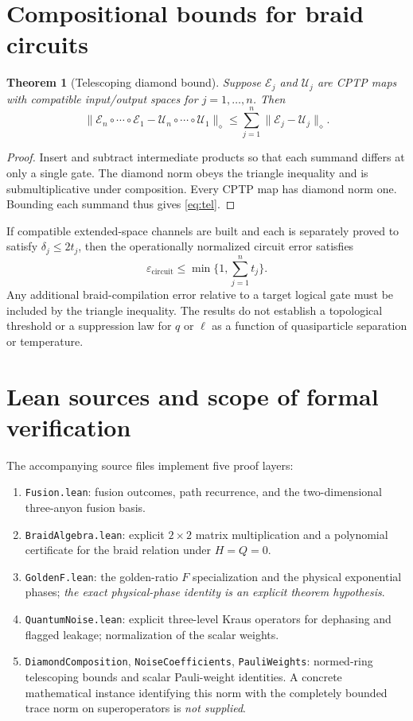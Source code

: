 \documentclass[11pt,a4paper]{article}
\newtheorem{theorem}{Theorem}[section]
\theoremstyle{remark}
\begin{document}
\section{Compositional bounds for braid circuits}
\begin{theorem}[Telescoping diamond bound]\label{thm:telescoping}
Suppose $\mathcal E_j$ and $\mathcal U_j$ are CPTP maps with compatible input/output spaces for $j=1,\dots,n$. Then
\begin{equation}\label{eq:tel}
\|\mathcal E_n\circ\cdots\circ\mathcal E_1
-\mathcal U_n\circ\cdots\circ\mathcal U_1\|_\diamond
\le \sum_{j=1}^n\|\mathcal E_j-\mathcal U_j\|_\diamond.
\end{equation}
\end{theorem}
\begin{proof}
Insert and subtract intermediate products so that each summand differs at only a single gate. The diamond norm obeys the triangle inequality and is submultiplicative under composition. Every CPTP map has diamond norm one. Bounding each summand thus gives \eqref{eq:tel}.
\end{proof}

If compatible extended-space channels are built and each is separately proved to satisfy $\delta_j\le 2t_j$, then the operationally normalized circuit error satisfies
\begin{equation}
\varepsilon_{\mathrm{circuit}}\le\min\bigl\{1,\sum_{j=1}^n t_j\bigr\}.
\end{equation}
Any additional braid-compilation error relative to a target logical gate must be included by the triangle inequality. The results do not establish a topological threshold or a suppression law for $q$ or $\ell$ as a function of quasiparticle separation or temperature.

\section{Lean sources and scope of formal verification}
The accompanying source files implement five proof layers:
\begin{enumerate}[label=\arabic*.]
\item \texttt{Fusion.lean}: fusion outcomes, path recurrence, and the two-dimensional three-anyon fusion basis.
\item \texttt{BraidAlgebra.lean}: explicit $2\times2$ matrix multiplication and a polynomial certificate for the braid relation under $H=Q=0$.
\item \texttt{GoldenF.lean}: the golden-ratio $F$ specialization and the physical exponential phases; \emph{the exact physical-phase identity is an explicit theorem hypothesis}.
\item \texttt{QuantumNoise.lean}: explicit three-level Kraus operators for dephasing and flagged leakage; normalization of the scalar weights.
\item \texttt{DiamondComposition}, \texttt{NoiseCoefficients}, \texttt{PauliWeights}: normed-ring telescoping bounds and scalar Pauli-weight identities. A concrete mathematical instance identifying this norm with the completely bounded trace norm on superoperators is \emph{not supplied}.
\end{enumerate}
\end{document}
